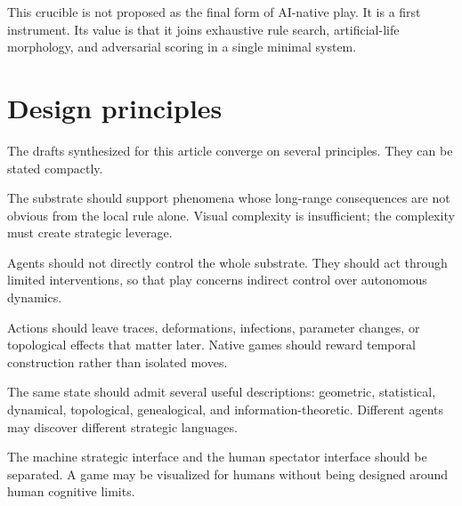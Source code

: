 \begin{remark}
This crucible is not proposed as the final form of AI-native play. It is a first instrument. Its value is that it joins exhaustive rule search, artificial-life morphology, and adversarial scoring in a single minimal system.
\end{remark}

\section{Design principles}\label{sec:principles}

The drafts synthesized for this article converge on several principles. They can be stated compactly.

\begin{principle}\label{prin:nontriviality}
The substrate should support phenomena whose long-range consequences are not obvious from the local rule alone. Visual complexity is insufficient; the complexity must create strategic leverage.
\end{principle}

\begin{principle}\label{prin:bounded-intervention}
Agents should not directly control the whole substrate. They should act through limited interventions, so that play concerns indirect control over autonomous dynamics.
\end{principle}

\begin{principle}\label{prin:persistent-consequence}
Actions should leave traces, deformations, infections, parameter changes, or topological effects that matter later. Native games should reward temporal construction rather than isolated moves.
\end{principle}

\begin{principle}\label{prin:multiple-compressions}
The same state should admit several useful descriptions: geometric, statistical, dynamical, topological, genealogical, and information-theoretic. Different agents may discover different strategic languages.
\end{principle}

\begin{principle}\label{prin:observer-separation}
The machine strategic interface and the human spectator interface should be separated. A game may be visualized for humans without being designed around human cognitive limits.
\end{principle}

